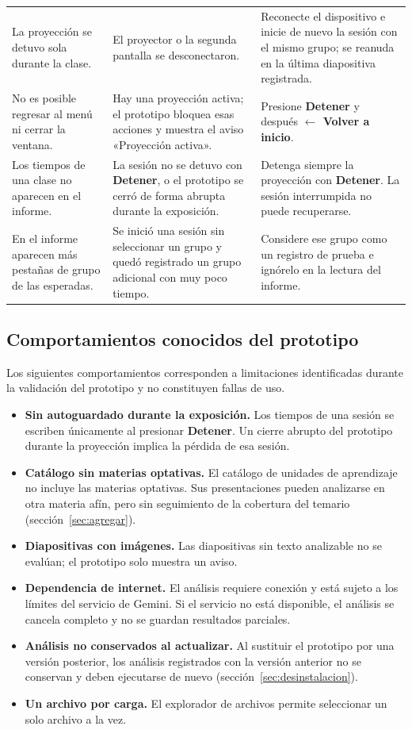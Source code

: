 \documentclass[11pt,letterpaper]{article}
\newcommand{\boton}[1]{\textbf{#1}}
\newcommand{\msg}[1]{«#1»}
\newcommand{\fizq}{\ensuremath{\leftarrow}}
\newcommand{\tsep}{\arrayrulecolor{bordegris}\midrule[0.3pt]}
\begin{document}
\begin{longtable}{L{4.4cm}L{4.8cm}L{5.6cm}}
La proyección se detuvo sola durante la clase. & El proyector o la segunda pantalla se desconectaron. & Reconecte el dispositivo e inicie de nuevo la sesión con el mismo grupo; se reanuda en la última diapositiva registrada. \\ \tsep
No es posible regresar al menú ni cerrar la ventana. & Hay una proyección activa; el prototipo bloquea esas acciones y muestra el aviso \msg{Proyección activa}. & Presione \boton{Detener} y después \boton{\fizq{} Volver a inicio}. \\ \tsep
Los tiempos de una clase no aparecen en el informe. & La sesión no se detuvo con \boton{Detener}, o el prototipo se cerró de forma abrupta durante la exposición. & Detenga siempre la proyección con \boton{Detener}. La sesión interrumpida no puede recuperarse. \\ \tsep
En el informe aparecen más pestañas de grupo de las esperadas. & Se inició una sesión sin seleccionar un grupo y quedó registrado un grupo adicional con muy poco tiempo. & Considere ese grupo como un registro de prueba e ignórelo en la lectura del informe. \\
\end{longtable}

\subsection{Comportamientos conocidos del prototipo}
\label{sec:conocidos}

Los siguientes comportamientos corresponden a limitaciones identificadas durante la validación del prototipo y no constituyen fallas de uso.

\begin{itemize}
  \item \textbf{Sin autoguardado durante la exposición.} Los tiempos de una sesión se escriben únicamente al presionar \boton{Detener}. Un cierre abrupto del prototipo durante la proyección implica la pérdida de esa sesión.
  \item \textbf{Catálogo sin materias optativas.} El catálogo de unidades de aprendizaje no incluye las materias optativas. Sus presentaciones pueden analizarse en otra materia afín, pero sin seguimiento de la cobertura del temario (sección~\ref{sec:agregar}).
  \item \textbf{Diapositivas con imágenes.} Las diapositivas sin texto analizable no se evalúan; el prototipo solo muestra un aviso.
  \item \textbf{Dependencia de internet.} El análisis requiere conexión y está sujeto a los límites del servicio de Gemini. Si el servicio no está disponible, el análisis se cancela completo y no se guardan resultados parciales.
  \item \textbf{Análisis no conservados al actualizar.} Al sustituir el prototipo por una versión posterior, los análisis registrados con la versión anterior no se conservan y deben ejecutarse de nuevo (sección~\ref{sec:desinstalacion}).
  \item \textbf{Un archivo por carga.} El explorador de archivos permite seleccionar un solo archivo a la vez.
\end{itemize}
\end{document}
